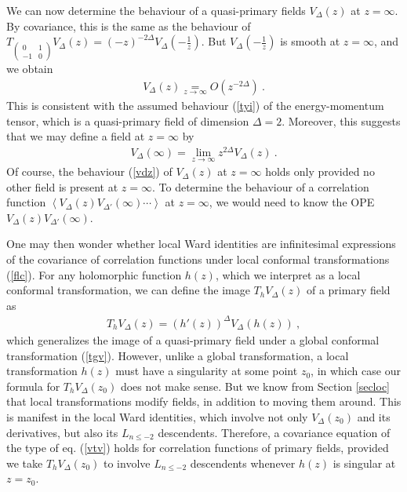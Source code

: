 \documentclass[12pt,a4paper,notitlepage]{report}
\newcommand \la {\left\langle}
\newcommand \ra {\right\rangle}
\numberwithin{equation}{section}
\theoremstyle{break}
\begin{document}
We can now determine the behaviour of a quasi-primary fields $V_\Delta(z)$ at $z=\infty$. By covariance, this is the same as the behaviour of $T_{\left(\begin{smallmatrix} 0 & 1 \\ -1 & 0 \end{smallmatrix}\right)}V_\Delta(z)= (-z)^{-2\Delta}V_\Delta(-\frac{1}{z})$. But $V_\Delta(-\frac{1}{z})$ is smooth at $z=\infty$, and we obtain
\begin{align}
 \boxed{V_\Delta(z) \underset{z\rightarrow \infty}{=} O\left(z^{-2\Delta}\right)}\ .
\label{vdz}
\end{align}
This is consistent with the assumed behaviour (\ref{tyi}) of the energy-momentum tensor, which is a quasi-primary field of dimension $\Delta=2$. Moreover, this suggests that we may define a field at $z=\infty$ by 
\begin{align}
 V_\Delta(\infty) = \underset{z\rightarrow \infty}{\lim} z^{2\Delta} V_\Delta(z)\ . 
\end{align}
Of course, the behaviour (\ref{vdz}) of $V_\Delta(z)$ at $z=\infty$ holds only provided no other field is present at $z=\infty$. To determine the behaviour of a correlation function $\la V_\Delta(z) V_{\Delta'}(\infty)\cdots \ra$ at $z=\infty$, we would need to know the OPE $V_\Delta(z) V_{\Delta'}(\infty)$.

One may then wonder whether local Ward identities are infinitesimal expressions of the covariance of correlation functions under local conformal transformations (\ref{flc}). For any holomorphic function $h(z)$, which we interpret as a local conformal transformation, we can define the image $T_hV_\Delta(z)$ of a primary field as 
\begin{align}
 \boxed{T_h V_\Delta(z) = (h'(z))^{\Delta} V_\Delta(h(z))}\ ,
\label{thv}
\end{align}
which generalizes the image of a quasi-primary field under a global conformal transformation (\ref{tgv}). However, unlike a global transformation, a local transformation $h(z)$ must have a singularity at some point $z_0$, in which case our formula for $T_hV_\Delta(z_0)$ does not make sense. But we know from Section \ref{secloc} that local transformations modify fields, in addition to moving them around. This is manifest in the local Ward identities, which involve not only $V_\Delta(z_0)$ and its derivatives, but also its $L_{n\leq -2}$ descendents. 
Therefore, a covariance equation of the type of eq. (\ref{vtv}) holds for correlation functions of primary fields, provided we take $T_h V_\Delta(z_0)$ to involve $L_{n\leq -2}$ descendents whenever $h(z)$ is singular at $z=z_0$. 
\end{document}
